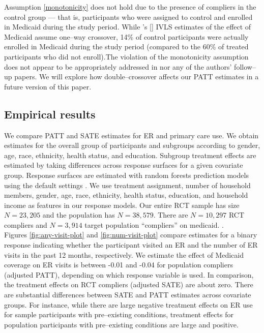 \documentclass[12pt]{article}
\newcommand{\possessivecite}[1]{\citeauthor{#1}'s [\citeyear{#1}]}
\newcommand{\todo}[1]{{\color{red}{TO DO: \sc #1}}}
\begin{document}
Assumption \ref{monotonicity} does not hold due to the presence of compliers in the control group --- that is, participants who were assigned to control and enrolled in Medicaid during the study period. While \possessivecite{finkelstein2012} IVLS estimates of the effect of Medicaid assume one--way crossover, 14\% of control participants were actually enrolled in Medicaid during the study period (compared to the 60\% of treated participants who did not enroll).The violation of the monotonicity assumption does not appear to be appropriately addressed in \citet{finkelstein2012} nor any of the authors' follow--up papers. We will explore how double--crossover affects our PATT estimates in a future version of this paper. 

\subsection{Empirical results}

We compare PATT and SATE estimates for ER and primary care use. We obtain estimates for the overall group of participants and subgroups according to gender, age, race, ethnicity, health status, and education. Subgroup treatment effects are estimated by taking differences across response surfaces for a given covariate group. Response surfaces are estimated with random forests prediction models using the default settings \citep{breiman2001}. We use treatment assignment, number of household members, gender, age, race, ethnicity, health status, education, and household income as features in our response models. Our entire RCT sample has size $N=23,205$ and the population has $N=38,579$. There are $N=10,297$ RCT compliers and $N=3,914$ target population ``compliers'' on medicaid. \todo{Population compliers N seems small}. \\

Figures \ref{fig:any-visit-plot} and \ref{fig:num-visit-plot} compare estimates for a binary response indicating whether the participant visited an ER and the number of ER visits in the past 12 months, respectively. We estimate the effect of Medicaid coverage on ER visits is between -0.01 and -0.04 for population compliers (adjusted PATT), depending on which response variable is used. In comparison, the treatment effects on RCT compliers (adjusted SATE) are about zero. There are substantial differences between SATE and PATT estimates across covariate groups. For instance, while there are large negative treatment effects on ER use for sample participants with pre--existing conditions, treatment effects for population participants with pre--existing conditions are large and positive. \\
 
\end{document}
